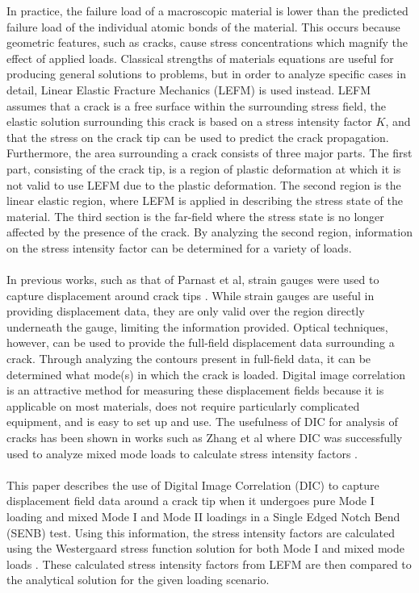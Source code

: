 \documentclass[12pt]{article}
\begin{document}
In practice, the failure load of a macroscopic material is lower than the predicted failure load of the individual atomic bonds of the material. This occurs because geometric features, such as cracks, cause stress concentrations which magnify the effect of applied loads. Classical strengths of materials equations are useful for producing general solutions to problems, but in order to analyze specific cases in detail, Linear Elastic Fracture Mechanics (LEFM) is used instead. LEFM assumes that a crack is a free surface within the surrounding stress field, the elastic solution surrounding this crack is based on a stress intensity factor $K$, and that the stress on the crack tip can be used to predict the crack propagation. Furthermore, the area surrounding a crack consists of three major parts. The first part, consisting of the crack tip, is a region of plastic deformation at which it is not valid to use LEFM due to the plastic deformation. The second region is the linear elastic region, where LEFM is applied in describing the stress state of the material. The third section is the far-field where the stress state is no longer affected by the presence of the crack. By analyzing the second region, information on the stress intensity factor can be determined for a variety of loads.
\\
\\
In previous works, such as that of Parnast et al, strain gauges were used to capture displacement around crack tips \cite{straingauge}. While strain gauges are useful in providing displacement data, they are only valid over the region directly underneath the gauge, limiting the information provided. Optical techniques, however, can be used to provide the full-field displacement data surrounding a crack. Through analyzing the contours present in full-field data, it can be determined what mode(s) in which the crack is loaded. Digital image correlation is an attractive method for measuring these displacement fields because it is applicable on most materials, does not require particularly complicated equipment, and is easy to set up and use. The usefulness of DIC for analysis of cracks has been shown in works such as Zhang et al where DIC was successfully used to analyze mixed mode loads to calculate stress intensity factors \cite{Zhang}.
\\
\\
This paper describes the use of Digital Image Correlation (DIC) to capture displacement field data around a crack tip when it undergoes pure Mode I loading and mixed Mode I and Mode II loadings in a Single Edged Notch Bend (SENB) test. Using this information, the stress intensity factors are calculated using the Westergaard stress function solution for both Mode I and mixed mode loads \cite{Fracture}. These calculated stress intensity factors from LEFM are then compared to the analytical solution for the given loading scenario.
\end{document}
